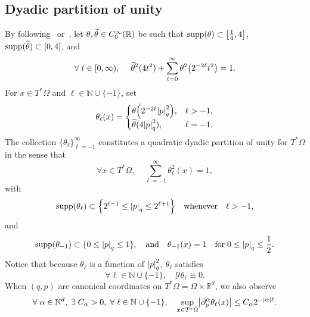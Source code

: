\documentclass[10pt]{amsart}
\theoremstyle{definition}\newtheorem{defi}[theo]{Definition}\newtheorem{rema}[theo]{Remark}\newtheorem{exam}[theo]{Example}\newtheorem{exem}[theo]{Example}\newtheorem{nota}[theo]{Notation}
\newcommand{\R}{\mathbb{R}}
\newcommand{\N}{\mathbb{N}}
\newcommand{\clY}{\mathcal{Y}}
\newcommand{\p}{\partial}
\DeclareMathOperator{\suppp}{supp}
\newcommand{\abs}[1]{\left| #1 \right|}
\newcommand{\supp}[1]{\suppp\left({#1}\right)}
\let\oldtilde\tilde
\renewcommand*{\tilde}[1]{\mathchoice{\widetilde{#1}}{\widetilde{#1}}{\oldtilde{#1}}{\oldtilde{#1}}}
\let\oldexists\exists
\renewcommand*{\exists}{\mathrel{\oldexists}}
\let\oldforall\forall
\renewcommand*{\forall}{\mathrel{\oldforall}}
\let\originalleft\left
\let\originalright\right
\renewcommand{\left}{\mathopen{}\mathclose\bgroup\originalleft}
\renewcommand{\right}{\aftergroup\egroup\originalright}
\begin{document}
\subsection{Dyadic partition of unity}\label{subSec:DyadicPartitionOfUnity}
By following~\cite{Leb1,Leb2} or~\cite{BCD}, let $\theta, \tilde{\theta} \in C^\infty_0(\R)$ be such that $\supp{\theta} \subset \left[\frac{1}{4}, 4 \right]$, $\suppp(\tilde{\theta}) \subset
[0,4]$, and
\begin{equation}\label{eq:dyadic}
\forall t\in [0,\infty), \phantom{ccc} \tilde{\theta}^{2}(4t^{2}) + \sum_{\ell=0}^{\infty} \theta^{2} \left(2^{-2 \ell} t^2 \right) = 1.
\end{equation}
For $x \in T^*\Omega$ and $\ell \in \N \cup \{-1\}$, set
\begin{equation}
\theta_\ell(x) =
\begin{cases}
\theta \left(2^{-2 \ell} \abs{p}^2_q\right),  &\ell > -1, \\
\tilde{\theta}(4 \abs{p}^2_q),  &\ell = -1.
\end{cases}
\end{equation}
The collection $\{\theta_\ell\}_{\ell = -1}^\infty$ constitutes a quadratic dyadic partition of unity for $T^*\Omega$ in the sense that
\begin{equation}
\forall x \in T^*\Omega,\quad \sum_{\ell = -1}^\infty \theta^2_\ell(x) = 1,
\end{equation}
with
\begin{equation}
\supp{\theta_\ell} \subset \left\{2^{\ell-1} \le \abs{p}_q \le 2^{\ell+1}\right\} \quad  \text{whenever} \quad \ell>-1,
\end{equation}
and
\begin{equation}
\supp{\theta_{-1}} \subset \{0 \le \abs{p}_q \le 1\}, \quad \text{and} \quad \theta_{-1}(x) = 1 \quad \text{for} \; 0 \le \abs{p}_q \le \frac{1}{2}.
\end{equation}
Notice that because $\theta_{\ell}$ is a function of $\abs{p}^2_q$, $\theta_{\ell}$ satisfies
\begin{equation}\label{Y_kills_theta_ell}
\forall \ell \in \N \cup \{-1\}, \quad \clY \theta_\ell \equiv 0.
\end{equation}
When $(q,p)$ are canonical coordinates on $T^* \Omega=\Omega\times\R^d$, we also observe
\begin{equation}\label{p_derivative_estimates_thetas}
\forall \alpha\in \N^d, \; \exists C_{\alpha}>0, \; \forall \ell \in \N \cup \{-1\}, \quad \sup_{x\in T^* \Omega} \left|\p_{p}^{\alpha}\theta_{\ell}(x)\right| \leq C_{\alpha} 2^{-|\alpha|\ell}.
\end{equation}
\end{document}
